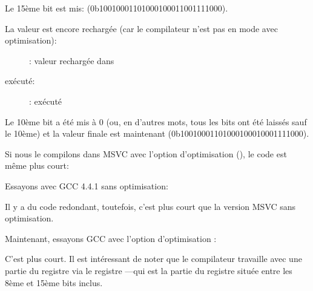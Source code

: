 Le 15ème bit est mis:  
(0b10010001101000{\color{red}1}00011001111000).

\clearpage
La valeur est encore rechargée (car le compilateur n'est pas en mode avec optimisation):

\begin{figure}[H]
\centering
{}
\caption{\olly: valeur rechargée dans \EDX}
\label{fig:set_reset_olly3}
\end{figure}

\clearpage
\AND exécuté:

\begin{figure}[H]
\centering
{}
\caption{\olly: \AND exécuté}
\label{fig:set_reset_olly4}
\end{figure}

Le 10ème bit a été mis à 0 (ou, en d'autres mots, tous les bits ont été laissés sauf
le 10ème) et la valeur finale est maintenant
 (0b1001000110100010001{\color{red}0}001111000).


Si nous le compilons dans MSVC avec l'option d'optimisation (\Ox), le code est même
plus court:




Essayons avec GCC 4.4.1 sans optimisation:



Il y a du code redondant, toutefois, c'est plus court que la version MSVC sans optimisation.

Maintenant, essayons GCC avec l'option d'optimisation \Othree:




C'est plus court.
Il est intéressant de noter que le compilateur travaille avec une partie du registre
\EAX via le registre \AH---qui est la partie du registre \EAX située entre les 8ème
et 15ème bits inclus.


